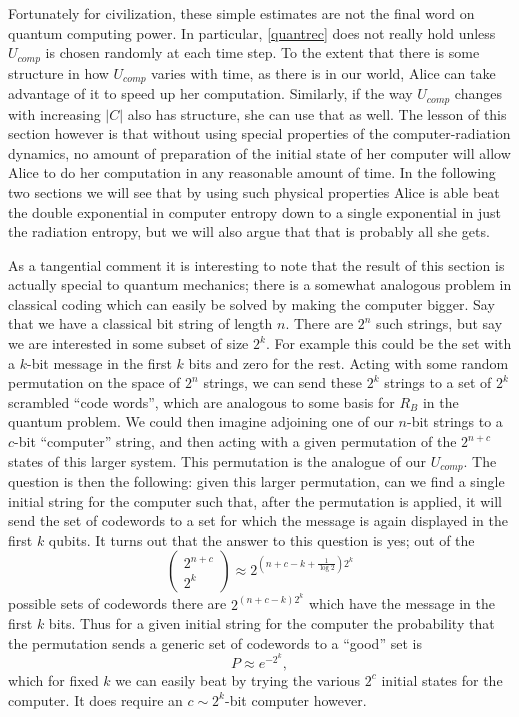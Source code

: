 \documentclass[12pt]{article}
\newcommand{\be}{\begin{equation}}
\newcommand{\ee}{\end{equation}}
\begin{document}
Fortunately for civilization, these simple estimates are not the final word on quantum computing power.  In particular, \eqref{quantrec} does not really hold unless $U_{comp}$ is chosen randomly at each time step.  To the extent that there is some structure in how $U_{comp}$ varies with time, as there is in our world, Alice can take advantage of it to speed up her computation.  Similarly, if the way $U_{comp}$ changes with increasing $|C|$ also has structure, she can use that as well.  The lesson of this section however is that without using special properties of the computer-radiation dynamics, no amount of preparation of the initial state of her computer will allow Alice to do her computation in any reasonable amount of time. In the following two sections we will see that by using such physical properties Alice is able beat the double exponential in computer entropy down to a single exponential in just the radiation entropy, but we will also argue that that is probably all she gets.

As a tangential comment it is interesting to note that the result of this section is actually special to quantum mechanics; there is a somewhat analogous problem in classical coding which can easily be solved by making the computer bigger.  Say that we have a classical bit string of length $n$.  There are $2^n$ such strings, but say we are interested in some subset of size $2^k$.  For example this could be the set with a $k$-bit message in the first $k$ bits and zero for the rest.  Acting with some random permutation on the space of $2^n$ strings, we can send these $2^k$ strings to a set of $2^k$ scrambled ``code words'', which are analogous to some basis for $R_B$ in the quantum problem.  We could then imagine adjoining one of our $n$-bit strings to a $c$-bit ``computer'' string, and then acting with a given permutation of the $2^{n+c}$ states of this larger system.  This permutation is the analogue of our $U_{comp}$.  The question is then the following: given this larger permutation, can we find a single initial string for the computer such that, after the permutation is applied, it will send the set of codewords to a set for which the message is again displayed in the first $k$ qubits.  It turns out that the answer to this question is yes; out of the
\be
\begin{pmatrix}
2^{n+c}\\
2^k
\end{pmatrix}\approx 2^{\left(n+c-k+\frac{1}{\log 2}\right)2^k}
\ee
possible sets of codewords there are $2^{(n+c-k)2^k}$ which have the message in the first $k$ bits.  Thus for a given initial string for the computer the probability that the permutation sends a generic set of codewords to a ``good'' set is
\be
P\approx e^{-2^k},
\ee
which for fixed $k$ we can easily beat by trying the various $2^c$ initial states for the computer.  It does require an $c\sim 2^k$-bit computer however.
\end{document}
